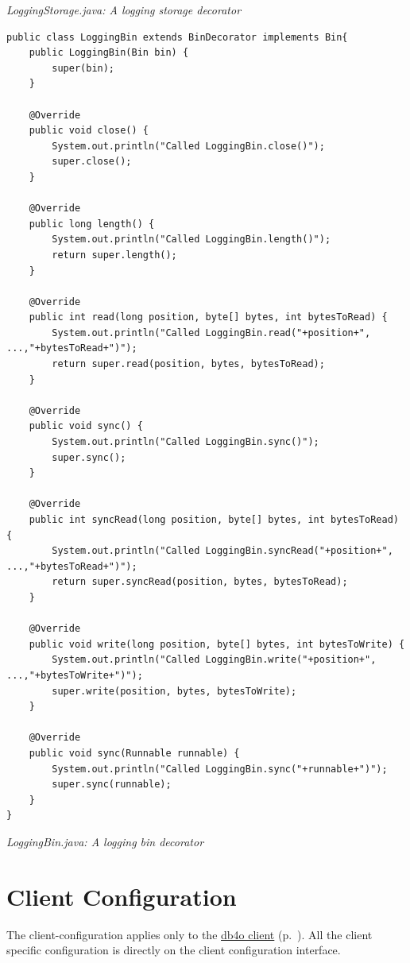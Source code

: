 {\small\itshape LoggingStorage.java: A logging storage decorator\par}
\medskip

\begin{lstlisting}
public class LoggingBin extends BinDecorator implements Bin{
    public LoggingBin(Bin bin) {
        super(bin);
    }

    @Override
    public void close() {
        System.out.println("Called LoggingBin.close()");
        super.close();
    }

    @Override
    public long length() {
        System.out.println("Called LoggingBin.length()");
        return super.length();
    }

    @Override
    public int read(long position, byte[] bytes, int bytesToRead) {
        System.out.println("Called LoggingBin.read("+position+", ...,"+bytesToRead+")");
        return super.read(position, bytes, bytesToRead);
    }

    @Override
    public void sync() {
        System.out.println("Called LoggingBin.sync()");
        super.sync();
    }

    @Override
    public int syncRead(long position, byte[] bytes, int bytesToRead) {
        System.out.println("Called LoggingBin.syncRead("+position+", ...,"+bytesToRead+")");
        return super.syncRead(position, bytes, bytesToRead);
    }

    @Override
    public void write(long position, byte[] bytes, int bytesToWrite) {
        System.out.println("Called LoggingBin.write("+position+", ...,"+bytesToWrite+")");
        super.write(position, bytes, bytesToWrite);
    }

    @Override
    public void sync(Runnable runnable) {
        System.out.println("Called LoggingBin.sync("+runnable+")");
        super.sync(runnable);
    }
}
\end{lstlisting}

{\small\itshape LoggingBin.java: A logging bin decorator\par}
\medskip

\section{Client Configuration}
\label{ref:configuration-client-configuration}

The client-configuration applies only to the \hyperref[ref:client-server]{db4o client} (p.~\pageref{ref:client-server}). All the client specific configuration is directly on the client configuration interface.

